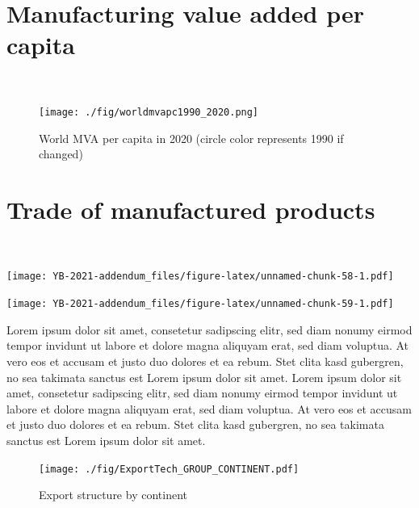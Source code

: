 \documentclass[
  openany, nofonts]{tufte-book}
\begin{document}
\pagebreak

\hypertarget{manufacturing-value-added-per-capita}{%
\section{Manufacturing value added per capita}\label{manufacturing-value-added-per-capita}}

~

\vspace*{\fill}

\begin{figure}
\texttt{[image: ./fig/worldmvapc1990\_2020.png]} \caption[World MVA per capita in 2020 (circle color represents 1990 if changed)]{World MVA per capita in 2020 (circle color represents 1990 if changed)}\label{fig:c04-worldmavapc}
\end{figure}

\pagebreak

\hypertarget{trade-of-manufactured-products-1}{%
\section{Trade of manufactured products}\label{trade-of-manufactured-products-1}}

~

\begin{marginfigure}
\texttt{[image: YB-2021-addendum\_files/figure-latex/unnamed-chunk-58-1.pdf]} \end{marginfigure}

\begin{marginfigure}
\texttt{[image: YB-2021-addendum\_files/figure-latex/unnamed-chunk-59-1.pdf]} \end{marginfigure}

Lorem ipsum dolor sit amet, consetetur sadipscing elitr, sed diam nonumy eirmod tempor invidunt ut labore et dolore magna aliquyam erat, sed diam voluptua. At vero eos et accusam et justo duo dolores et ea rebum. Stet clita kasd gubergren, no sea takimata sanctus est Lorem ipsum dolor sit amet. Lorem ipsum dolor sit amet, consetetur sadipscing elitr, sed diam nonumy eirmod tempor invidunt ut labore et dolore magna aliquyam erat, sed diam voluptua. At vero eos et accusam et justo duo dolores et ea rebum. Stet clita kasd gubergren, no sea takimata sanctus est Lorem ipsum dolor sit amet.

\vspace*{\fill}

\begin{figure}
\texttt{[image: ./fig/ExportTech\_GROUP\_CONTINENT.pdf]} \caption[Export structure by continent]{Export structure by continent}\label{fig:c04-continent-export}
\end{figure}
\end{document}
